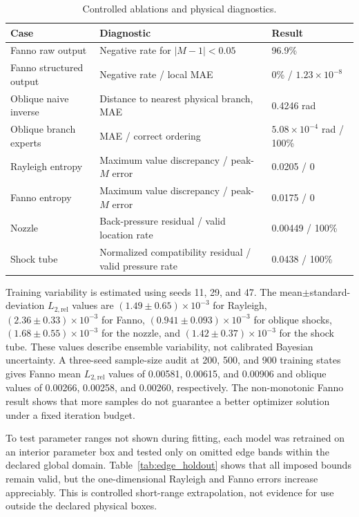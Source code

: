 \documentclass[preprint,12pt]{elsarticle}
\newenvironment{revision}{}{}
\newenvironment{revision}{\color{revisionblue}}{}
\newcommand{\relLtwo}{L_{2,\mathrm{rel}}}
\begin{document}
\begin{revision}
\begin{table}[H]
\centering
\caption{Controlled ablations and physical diagnostics.}
\label{tab:ablation_physics}
\small
\begin{tabular}{p{3.0cm}p{5.3cm}p{3.0cm}}
\toprule
Case & Diagnostic & Result \\
\midrule
Fanno raw output & Negative rate for $|M-1|<0.05$ & 96.9\% \\
Fanno structured output & Negative rate / local MAE & 0\% / $1.23\times10^{-8}$ \\
Oblique naive inverse & Distance to nearest physical branch, MAE & 0.4246 rad \\
Oblique branch experts & MAE / correct ordering & $5.08\times10^{-4}$ rad / 100\% \\
Rayleigh entropy & Maximum value discrepancy / peak-$M$ error & 0.0205 / 0 \\
Fanno entropy & Maximum value discrepancy / peak-$M$ error & 0.0175 / 0 \\
Nozzle & Back-pressure residual / valid location rate & 0.00449 / 100\% \\
Shock tube & Normalized compatibility residual / valid pressure rate & 0.0438 / 100\% \\
\bottomrule
\end{tabular}
\end{table}

Training variability is estimated using seeds 11, 29, and 47. The mean$\pm$standard-deviation $\relLtwo$ values are $(1.49\pm0.65)\times10^{-3}$ for Rayleigh, $(2.36\pm0.33)\times10^{-3}$ for Fanno, $(0.941\pm0.093)\times10^{-3}$ for oblique shocks, $(1.68\pm0.55)\times10^{-3}$ for the nozzle, and $(1.42\pm0.37)\times10^{-3}$ for the shock tube. These values describe ensemble variability, not calibrated Bayesian uncertainty. A three-seed sample-size audit at 200, 500, and 900 training states gives Fanno mean $\relLtwo$ values of 0.00581, 0.00615, and 0.00906 and oblique values of 0.00266, 0.00258, and 0.00260, respectively. The non-monotonic Fanno result shows that more samples do not guarantee a better optimizer solution under a fixed iteration budget.

To test parameter ranges not shown during fitting, each model was retrained on an interior parameter box and tested only on omitted edge bands within the declared global domain. Table~\ref{tab:edge_holdout} shows that all imposed bounds remain valid, but the one-dimensional Rayleigh and Fanno errors increase appreciably. This is controlled short-range extrapolation, not evidence for use outside the declared physical boxes.


\end{revision}
\end{document}
